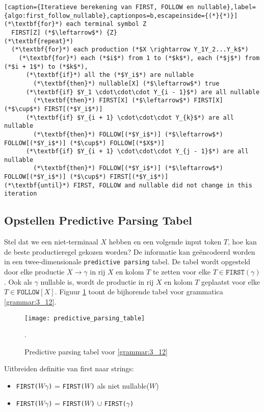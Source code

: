 \begin{lstlisting}[caption={Iteratieve berekening van FIRST, FOLLOW en nullable},label={algo:first_follow_nullable},captionpos=b,escapeinside={(*}{*)}]
(*\textbf{for}*) each terminal symbol Z
  FIRST[Z] (*$\leftarrow$*) {Z}
(*\textbf{repeat}*) 
  (*\textbf{for}*) each production (*$X \rightarrow Y_1Y_2...Y_k$*)
    (*\textbf{for}*) each (*$i$*) from 1 to (*$k$*), each (*$j$*) from (*$i + 1$*) to (*$k$*),
      (*\textbf{if}*) all the (*$Y_i$*) are nullable
        (*\textbf{then}*) nullable[X] (*$\leftarrow$*) true
      (*\textbf{if} $Y_1 \cdot\cdot\cdot Y_{i - 1}$*) are all nullable 
        (*\textbf{then}*) FIRST[X] (*$\leftarrow$*) FIRST[X] (*$\cup$*) FIRST[(*$Y_i$*)]
      (*\textbf{if} $Y_{i + 1} \cdot\cdot\cdot Y_{k}$*) are all nullable 
        (*\textbf{then}*) FOLLOW[(*$Y_i$*)] (*$\leftarrow$*) FOLLOW[(*$Y_i$*)] (*$\cup$*) FOLLOW[(*$X$*)]
      (*\textbf{if} $Y_{i + 1} \cdot\cdot\cdot Y_{j - 1}$*) are all nullable 
        (*\textbf{then}*) FOLLOW[(*$Y_i$*)] (*$\leftarrow$*) FOLLOW[(*$Y_i$*)] (*$\cup$*) FIRST[(*$Y_i$*)]
(*\textbf{until}*) FIRST, FOLLOW and nullable did not change in this iteration
\end{lstlisting}



\subsection{Opstellen Predictive Parsing Tabel}
Stel dat we een niet-terminaal $X$ hebben en een volgende input token $T$, hoe kan de beste productieregel gekozen worden? De informatie kan geëncodeerd worden in een twee-dimensionale \texttt{predictive parsing} tabel. De tabel wordt opgesteld door elke productie $X \rightarrow \gamma$ in rij $X$ en kolom $T$ te zetten voor elke $T \in \texttt{FIRST}(\gamma)$. Ook als $\gamma$ nullable is, wordt de productie in rij $X$ en kolom $T$ geplaatst voor elke $T \in \texttt{FOLLOW}[X]$. Figuur \ref{fig:predictive_parsing_table} toont de bijhorende tabel voor grammatica \ref{grammar:3_12}.
\begin{figure}
	\texttt{[image: predictive\_parsing\_table]}
	\caption{Predictive parsing tabel voor \ref{grammar:3_12}}.
	\label{fig:predictive_parsing_table}
\end{figure}

Uitbreiden definitie van first naar strings:
\begin{itemize}
	\item \texttt{FIRST($W\gamma$)} = \texttt{FIRST($W$)} als niet nullable($W$)
	\item \texttt{FIRST($W\gamma$)} = \texttt{FIRST($W$)} $\cup$ \texttt{FIRST($\gamma$)} 
\end{itemize}


